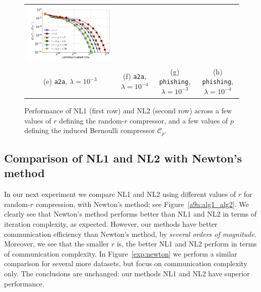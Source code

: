 \documentclass[12pt]{article}
\newcommand{\cC}{{\mathcal{C}}}
\begin{document}
\begin{figure}[ht]
\begin{center}
{\begin{tabular}{cccc}
				\includegraphics[width = 0.23 \textwidth]{LogReg/phishing/Lambda=1e-4/phishing_nl2_bits_lmb=0.0001.pdf}
				\\
				(e) {\tt a2a}, $\lambda=10^{-3}$ &(f) {\tt a2a}, $\lambda=10^{-4}$ & (g) {\tt phishing}, $\lambda=10^{-3}$ &(h) {\tt phishing}, $\lambda=10^{-4}$
		\end{tabular}}
		\caption{Performance of {\sf NL1} (first row) and {\sf NL2} (second row) across a few  values of $r$ defining the random-$r$ compressor, and a few values of $p$ defining the induced Bernoulli compressor $\cC_p$. }
		\label{exp:NL1_NL2}
	\end{center}
	\vskip -0.2in
\end{figure}




\subsection{Comparison of {\sf NL1} and {\sf NL2} with Newton's method}

In our next experiment we compare {\sf NL1} and {\sf NL2} using different values of $r$ for random-$r$ compression, with Newton's method; see Figure~\ref{a9a:alg1_alg2}. We clearly see that Newton's method performs better than {\sf NL1} and {\sf NL2} in terms of iteration complexity, as expected. However, our methods have better communication efficiency than Newton's method, by {\em several orders of magnitude}. Moreover, we see that the smaller $r$ is, the better {\sf NL1} and {\sf NL2} perform in terms of communication complexity. In  Figure~\ref{exp:newton} we perform a similar comparison for several more datasets, but focus on communication complexity only. The conclusions are unchanged: our methods  {\sf NL1} and {\sf NL2} have superior performance.
\end{document}
